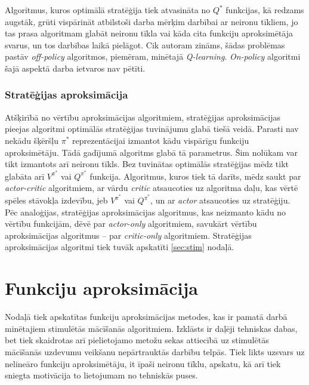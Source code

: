\documentclass{ludis} %
\begin{document}
Algoritmus, kuros optimālā stratēģija tiek atvasināta no $Q^*$ funkcijas, kā
redzams augstāk, grūti vispārināt atbilstoši darba mērķim darbībai ar neironu
tīkliem, jo tas prasa algoritmam glabāt neironu tīkla vai kāda cita funkciju
aproksimētāja svarus, un tos darbības laikā pielāgot. Cik autoram zināms, šādas
problēmas pastāv \textit{off-policy} algoritmos, piemēram, minētajā
\textit{Q-learning}. \textit{On-policy} algoritmi šajā aspektā darba ietvaros
nav pētīti.

\subsubsection{Stratēģijas aproksimācija}
Atšķirībā no vērtību aproksimācijas algoritmiem, stratēģijas aproksimācijas
pieejas algoritmi optimālās stratēģijas tuvinājumu glabā tiešā veidā. Parasti
nav nekādu šķēršļu $\pi^*$ reprezentācijai izmantot kādu vispārīgu funkciju
aproksimētāju. Tādā gadījumā algoritms glabā tā parametrus. Šim nolūkam var tikt
izmantots arī neironu tīkls. Bez tuvinātas optimālās stratēģijas mēdz tikt
glabāta arī $V^{\pi^*}$ vai $Q^{\pi^*}$ funkcija. Algoritmus, kuros tiek tā
darīts, mēdz saukt par \textit{actor-critic} algoritmiem, ar vārdu
\textit{critic} atsaucoties uz algoritma daļu, kas vērtē spēles stāvokļa
izdevību, jeb $V^{\pi^*}$ vai $Q^{\pi^*}$, un ar \textit{actor} atsaucoties uz
stratēģiju. Pēc analoģijas, stratēģijas aproksimācijas algoritmus, kas neizmanto
kādu no vērtību funkcijām, dēvē par \textit{actor-only} algoritmiem, savukārt
vērtību aproksimācijas algoritmus -- par \textit{critic-only} algoritmiem.
Stratēģijas aproksimācijas algoritmi tiek tuvāk apskatīti \ref{sec:stim}
nodaļā.

\section{Funkciju aproksimācija}
Nodaļā tiek apskatītas funkciju aproksimācijas metodes, kas ir pamatā darbā
minētajiem stimulētās mācīšanās algoritmiem. Izklāsts ir daļēji tehniskas dabas,
bet tiek skaidrotas arī pielietojamo metožu sekas attiecībā uz stimulētās
mācīšanās uzdevumu veikšanu nepārtrauktās darbību telpās. Tiek likts uzsvars uz
nelineāro funkciju aproksimētāju, it īpaši neironu tīklu, apskatu, kā arī tiek
sniegta motivācija to lietojumam no tehniskās puses.
\end{document}
